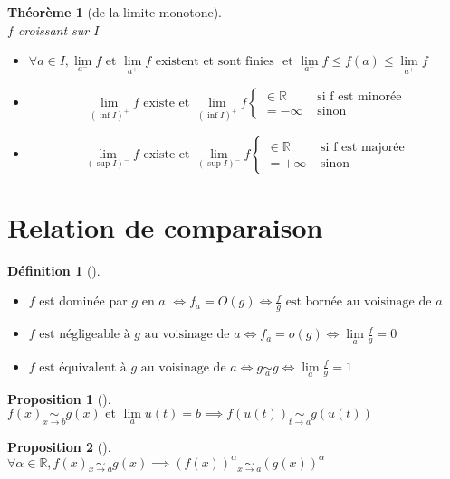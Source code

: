 \documentclass{article}
\newcommand{\R}{\mathbb{R}}
\newcommand{\et}{\text{ et }}
\newcommand{\lm}{\lim\limits}
\newcommand{\voi}[1]{\text{ au voisinage de }#1}
\newcommand{\equ}[1][]{\underset{#1}{\sim}}
\theoremstyle{definition}
\newtheorem*{prop}{Proposition}
\newtheorem*{defin}{Définition}
\theoremstyle{remark}
\theoremstyle{plain}
\newtheorem*{them}{Théorème}
\newenvironment{prp}[1][]
{\begin{prop}[#1]\quad\\}
{\end{prop}}
\newenvironment{dfn}[1][]
{\begin{defin}[#1]\quad\\}
{\end{defin}}
\newenvironment{thm}[1][]
{\begin{them}[#1]\quad\\}
{\end{them}}
\begin{document}
\begin{thm}[de la limite monotone]
$f$ croissant sur $I$
\begin{itemize}
    \item $\forall a \in I, \lm_{a^-} f \et \lm_{a^+} f 
    \text{ existent et sont finies }
    \et \lm_{a^-} f \leq f(a) \leq \lm_{a^+} f$
    \item \[
        \lm_{(\inf I)^+} f \text{ existe} \et
        \lm_{(\inf I)^+} f 
        \begin{cases}
            \in \R      &\text{ si f est minorée} \\
            = -\infty   &\text{ sinon}
        \end{cases}
    \]
    \item \[
        \lm_{(\sup I)^-} f \text{ existe} \et
        \lm_{(\sup I)^-} f 
        \begin{cases}
            \in \R      &\text{ si f est majorée} \\
            = +\infty   &\text{ sinon}
        \end{cases}
    \]
\end{itemize}
\end{thm}

\section{Relation de comparaison}

\begin{dfn}
\begin{itemize}
    \item $f$ est dominée par $g$ en $a$ $\iff f_a = O(g) \iff
    \frac{f}{g} \text{ est bornée} \voi{a}$
    \item $f \text{ est négligeable à } g \voi{a} \iff f_a = o(g)
    \iff \lm_a \frac{f}{g} = 0$
    \item $f \text{ est équivalent à } g \voi{a} \iff g \equ[a] g
    \iff \lm_a \frac{f}{g} = 1$
\end{itemize}
\end{dfn}

\begin{prp}
$f(x) \equ[x \to b] g(x) \et \lm_a u(t) = b 
\implies f(u(t)) \equ[t \to a] g(u(t))$
\end{prp}

\begin{prp}
$\forall \alpha \in \R, f(x) \equ[x \to a] g(x)
\implies (f(x))^\alpha \equ[x \to a] (g(x))^\alpha$
\end{prp}
\end{document}
